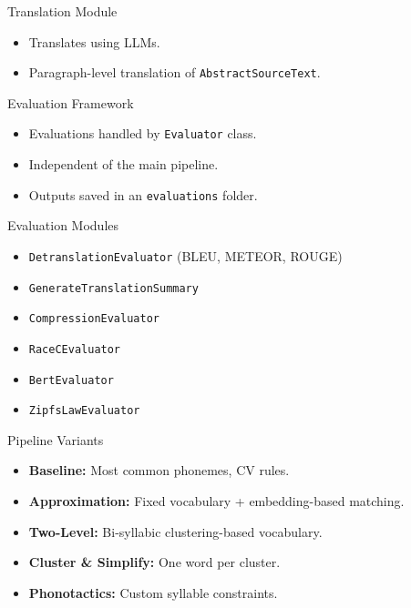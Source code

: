 \documentclass{beamer}
\begin{document}
\begin{frame}{Translation Module}
	\begin{itemize}
		\item Translates using LLMs.
		\item Paragraph-level translation of \texttt{AbstractSourceText}.
	\end{itemize}
\end{frame}

\begin{frame}{Evaluation Framework}
	\begin{itemize}
		\item Evaluations handled by \texttt{Evaluator} class.
		\item Independent of the main pipeline.
		\item Outputs saved in an \texttt{evaluations} folder.
	\end{itemize}
\end{frame}

\begin{frame}{Evaluation Modules}
	\begin{itemize}
			\item \texttt{DetranslationEvaluator} (BLEU, METEOR, ROUGE)
			\item \texttt{GenerateTranslationSummary}
			\item \texttt{CompressionEvaluator}
			\item \texttt{RaceCEvaluator}
			\item \texttt{BertEvaluator}
			\item \texttt{ZipfsLawEvaluator}
	\end{itemize}
\end{frame}

\begin{frame}{Pipeline Variants}
	\begin{itemize}
		\item \textbf{Baseline:} Most common phonemes, CV rules.
		\item \textbf{Approximation:} Fixed vocabulary + embedding-based matching.
		\item \textbf{Two-Level:} Bi-syllabic clustering-based vocabulary.
		\item \textbf{Cluster \& Simplify:} One word per cluster.
		\item \textbf{Phonotactics:} Custom syllable constraints.
	\end{itemize}
\end{frame}
\end{document}
